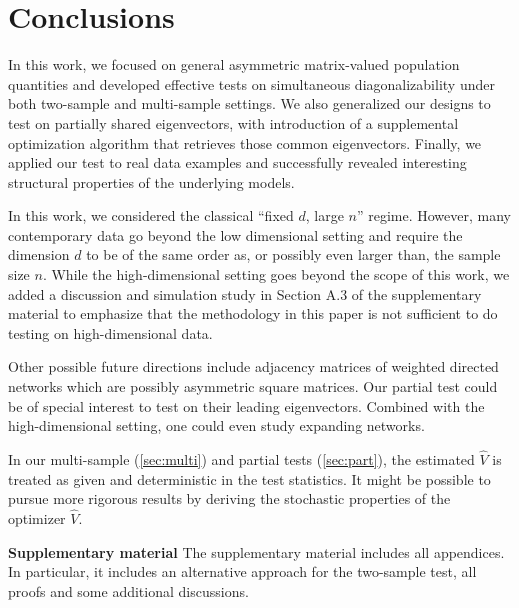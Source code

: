 \documentclass[12pt]{article}
\numberwithin{thm}{section}
\numberwithin{defn}{section}
\numberwithin{lem}{section}
\numberwithin{prop}{section}
\numberwithin{cor}{section}
\numberwithin{rem}{section}
\begin{document}
\vspace{-0.5cm}
\section{Conclusions}\label{sec:con}
\vspace{-0.3cm}
In this work, we focused on general asymmetric matrix-valued population quantities and developed effective tests on simultaneous diagonalizability under both two-sample and multi-sample settings. We also generalized our designs to test on partially shared eigenvectors, with introduction of a supplemental optimization algorithm that retrieves those common eigenvectors. 
Finally, we applied our test to real data examples and successfully revealed interesting structural properties of the underlying models.

In this work, we considered the classical ``fixed $d$, large $n$” regime. However, many contemporary data go beyond the low dimensional setting and require the dimension $d$ to be of the same order as, or possibly even larger than, the sample size $n$.
While the high-dimensional setting goes beyond the scope of this work, we added a discussion and simulation study in {\color{cyan} Section A.3} of the supplementary material to emphasize that the methodology in this paper is not sufficient to do testing on high-dimensional data.

Other possible future directions include adjacency matrices of weighted directed networks which are possibly asymmetric square matrices. Our partial test could be of special interest to test on their leading eigenvectors. %
Combined with the high-dimensional setting, one could even study expanding networks.

In our multi-sample (\autoref{sec:multi}) and partial tests (\autoref{sec:part}), the estimated $\widehat{V}$ is treated as given and deterministic in the test statistics. It might be possible to pursue more rigorous results by deriving the stochastic properties of the optimizer $\widehat{V}$. 



\noindent
\textbf{Supplementary material} The supplementary material includes all appendices. In particular, it includes an alternative approach for the two-sample test, all proofs and some additional discussions.
\end{document}
